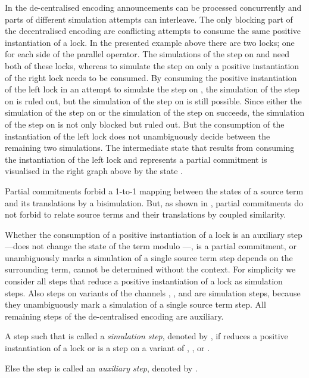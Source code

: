 \documentclass[]{eptcs}
\begin{document}
  In the de-centralised encoding announcements can be processed concurrently and parts of different simulation attempts can interleave. The only blocking part of the decentralised encoding are conflicting attempts to consume the same positive instantiation of a lock.
  In the presented example above there are two locks; one for each side of the parallel operator. The simulations of the step on  and  need both of these locks, whereas to simulate the step on  only a positive instantiation of the right lock needs to be consumed.
  By consuming the positive instantiation of the left lock in an attempt to simulate the step on , the simulation of the step on  is ruled out, but the simulation of the step on  is still possible. Since either the simulation of the step on  or the simulation of the step on  succeeds, the simulation of the step on  is not only blocked but ruled out. But the consumption of the instantiation of the left lock does not unambiguously decide between the remaining two simulations. The intermediate state that results from consuming the instantiation of the left lock and represents a partial commitment is visualised in the right graph above by the state .

  Partial commitments forbid a 1-to-1 mapping between the states of  a source term and its translations by a bisimulation. But, as shown in \cite{parrowCoupled92}, partial commitments do not forbid to relate source terms and their translations by coupled similarity.

Whether the consumption of a positive instantiation of a lock is an auxiliary step---does not change the state of the term modulo ---, is a partial commitment, or unambiguously marks a simulation of a single source term step depends on the surrounding term, \ie cannot be determined without the context. For simplicity we consider all steps that reduce a positive instantiation of a lock as simulation steps.
Also steps on variants of the channels , , and  are simulation steps, because they unambiguously mark a simulation of a single source term step. All remaining steps of the de-centralised encoding are auxiliary.

\begin{definition}
	A step  such that  is called a \emph{simulation step}, denoted by , if  reduces a positive instantiation of a lock or is a step on a variant of , , or .
	
	Else the step  is called an \emph{auxiliary step}, denoted by .
	\label{def:auxStepsDecentral}
\end{definition}
\end{document}

